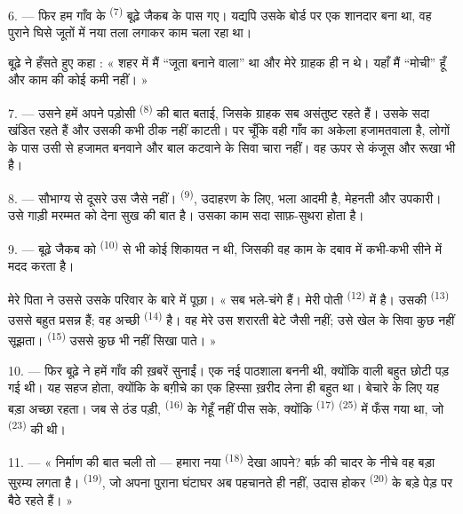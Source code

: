 6. --- फिर हम गाँव के  \textsuperscript{(7)} बूढ़े जैकब के पास गए।
यद्यपि उसके बोर्ड पर एक शानदार  बना था, वह पुराने घिसे जूतों में नया
तला लगाकर काम चला रहा था।

बूढ़े ने हँसते हुए कहा : « शहर में मैं “जूता बनाने वाला” था और मेरे ग्राहक ही न
थे। यहाँ मैं “मोची” हूँ और काम की कोई कमी नहीं। »

7. --- उसने हमें अपने पड़ोसी  \textsuperscript{(8)} की बात
बताई, जिसके ग्राहक सब असंतुष्ट रहते हैं। उसके  सदा खंडित रहते हैं
और उसकी  कभी ठीक नहीं काटती। पर चूँकि वही गाँव का अकेला
हजामतवाला है, लोगों के पास उसी से हजामत बनवाने और बाल कटवाने के सिवा चारा नहीं।
वह ऊपर से कंजूस और रूखा भी है।

8. --- सौभाग्य से दूसरे  उस जैसे नहीं। 
\textsuperscript{(9)}, उदाहरण के लिए, भला आदमी है, मेहनती और उपकारी। उसे गाड़ी
मरम्मत को देना सुख की बात है। उसका काम सदा साफ़-सुथरा होता है।

9. --- बूढ़े जैकब को  \textsuperscript{(10)} से भी कोई शिकायत न
थी, जिसकी वह काम के दबाव में कभी-कभी  सीने में मदद करता है।

मेरे पिता ने उससे उसके परिवार के बारे में पूछा। « सब भले-चंगे हैं। मेरी पोती
 \textsuperscript{(12)} में है। उसकी 
\textsuperscript{(13)} उससे बहुत प्रसन्न हैं; वह अच्छी 
\textsuperscript{(14)} है। वह मेरे उस शरारती बेटे जैसी नहीं; उसे खेल के सिवा कुछ
नहीं सूझता।  \textsuperscript{(15)} उससे कुछ भी नहीं
सिखा पाते। »

\VUsaut{3.0mm}
\VUsaut{3.0mm}

10. --- फिर बूढ़े ने हमें गाँव की ख़बरें सुनाईं। एक नई पाठशाला बननी थी, क्योंकि
 वाली बहुत छोटी पड़ गई थी। यह सहज होता, क्योंकि
 के बग़ीचे का एक हिस्सा ख़रीद लेना ही बहुत था। बेचारे के लिए
यह बड़ा अच्छा रहता। जब से ठंड पड़ी,  \textsuperscript{(16)} के
 गेहूँ नहीं पीस सके, क्योंकि  \textsuperscript{(17)}
 \textsuperscript{(25)} में फँस गया था, जो 
\textsuperscript{(23)} की थी।

11. --- « निर्माण की बात चली तो — हमारा नया  \textsuperscript{(18)}
देखा आपने? बर्फ़ की चादर के नीचे वह बड़ा सुरम्य लगता है। 
\textsuperscript{(19)}, जो अपना पुराना घंटाघर अब पहचानते ही नहीं, उदास होकर
 \textsuperscript{(20)} के बड़े पेड़ पर बैठे रहते हैं। »

